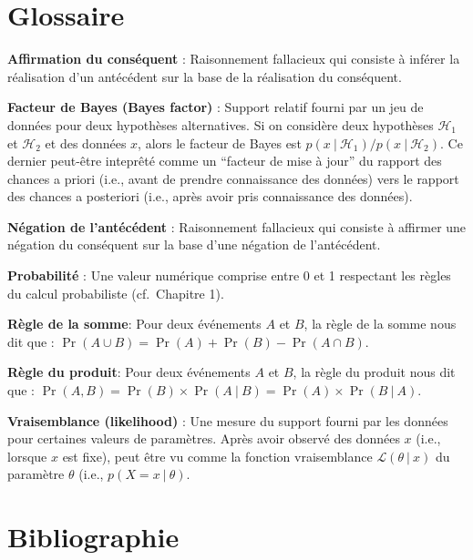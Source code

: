 \documentclass[
  a4paper,11pt,twoside,onecolumn,openright,final,oldfontcommands]{memoir}
\theoremstyle{definition}
\theoremstyle{definition}
\theoremstyle{definition}
\theoremstyle{definition}
\theoremstyle{remark}
\begin{document}
\hypertarget{appendix-annexes}{%
\appendix}


\hypertarget{glossaire}{%
\chapter{Glossaire}\label{glossaire}}

\textbf{Affirmation du conséquent} : Raisonnement fallacieux qui consiste à inférer la réalisation d'un antécédent sur la base de la réalisation du conséquent.

\textbf{Facteur de Bayes (Bayes factor)} : Support relatif fourni par un jeu de données pour deux hypothèses alternatives. Si on considère deux hypothèses \(\mathcal{H}_{1}\) et \(\mathcal{H}_{2}\) et des données \(x\), alors le facteur de Bayes est \(p(x \ | \ \mathcal{H}_{1}) / p(x \ | \ \mathcal{H}_{2})\). Ce dernier peut-être inteprêté comme un ``facteur de mise à jour'' du rapport des chances a priori (i.e., avant de prendre connaissance des données) vers le rapport des chances a posteriori (i.e., après avoir pris connaissance des données).

\textbf{Négation de l'antécédent} : Raisonnement fallacieux qui consiste à affirmer une négation du conséquent sur la base d'une négation de l'antécédent.

\textbf{Probabilité} : Une valeur numérique comprise entre 0 et 1 respectant les règles du calcul probabiliste (cf.~Chapitre 1).

\textbf{Règle de la somme}: Pour deux événements \(A\) et \(B\), la règle de la somme nous dit que : \(\Pr(A \cup B) = \Pr(A) + \Pr(B) - \Pr(A \cap B)\).

\textbf{Règle du produit}: Pour deux événements \(A\) et \(B\), la règle du produit nous dit que : \(\Pr(A, B) = \Pr(B) \times \Pr(A \ | \ B) = \Pr(A) \times \Pr(B \ | \ A)\).

\textbf{Vraisemblance (likelihood)} : Une mesure du support fourni par les données pour certaines valeurs de paramètres. Après avoir observé des données \(x\) (i.e., lorsque \(x\) est fixe), peut être vu comme la fonction vraisemblance \(\mathcal{L}(\theta\ |\ x)\) du paramètre \(\theta\) (i.e., \(p(X = x\ |\ \theta)\).

\hypertarget{bibliographie}{%
\chapter*{Bibliographie}\label{bibliographie}}
\end{document}
